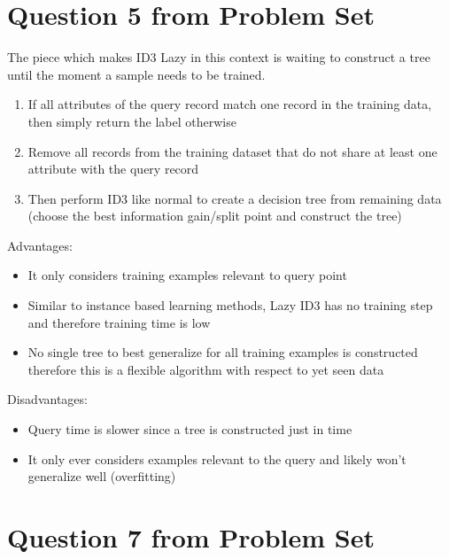 \documentclass{article}
\begin{document}
    \section{Question 5 from Problem Set}
    The piece which makes ID3 Lazy in this context is waiting to construct a tree until the moment a sample needs to be trained.
    \begin{enumerate}
        \item If all attributes of the query record match one record in the training data, then simply return the label otherwise
        \item Remove all records from the training dataset that do not share at least one attribute with the query record
        \item Then perform ID3 like normal to create a decision tree from remaining data (choose the best information gain/split point and construct the tree)
    \end{enumerate}
    Advantages:
    \begin{itemize}
        \item It only considers training examples relevant to query point
        \item Similar to instance based learning methods, Lazy ID3 has no training step and therefore training time is low
        \item No single tree to best generalize for all training examples is constructed therefore this is a flexible algorithm with respect to yet seen data
    \end{itemize}
    Disadvantages:
    \begin{itemize}
        \item Query time is slower since a tree is constructed just in time
        \item It only ever considers examples relevant to the query and likely won't generalize well (overfitting)
    \end{itemize}
    \section{Question 7 from Problem Set}
\end{document}
